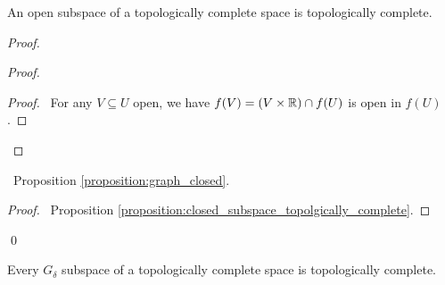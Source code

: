 \begin{proposition}
    \label{proposition:open_subspace_topologically_complete}
    An open subspace of a topologically complete space is topologically complete.
\end{proposition}

\begin{proof}
    \pf
    \begin{proof}
        \begin{proof}
            \pf\ For any $V \subseteq U$ open, we have $f(V) = (V \times \mathbb{R}) \cap f(U)$ is open in $f(U)$.
        \end{proof}
    \end{proof}
    \begin{proposition}
        \pf\ Proposition \ref{proposition:graph_closed}.
    \end{proposition}
    \qedstep
    \begin{proof}
        \pf\ Proposition \ref{proposition:closed_subspace_topolgically_complete}.
    \end{proof}
    \qed
\end{proof}

\begin{proposition}
    Every $G_\delta$ subspace of a topologically complete space is topologically complete.
\end{proposition}

